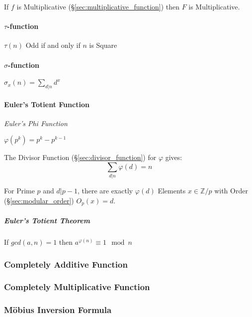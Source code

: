 If $f$ is Multiplicative (\S\ref{sec:multiplicative_function}) then
$F$ is Multiplicative.



\paragraph{$\tau$-function}\label{sec:tau_function}\hfill

$\tau(n)$ Odd if and only if $n$ is Square



\paragraph{$\sigma$-function}\label{sec:sigma_function}\hfill

$\sigma_x(n) = \sum_{d | n} d^x$



\paragraph{Euler's Totient Function}\label{sec:eulers_totient}\hfill

\emph{Euler's Phi Function}

$\varphi(p^k) = p^k - p^{k-1}$

The Divisor Function (\S\ref{sec:divisor_function}) for $\varphi$
gives:
\[
  \sum_{d|n}\varphi(d) = n
\]

For Prime $p$ and $d|p-1$, there are exactly $\varphi(d)$ Elements $x
\in \mathbb{Z}/p$ with Order (\S\ref{sec:modular_order}) $O_p(x) = d$.

\subparagraph{Euler's Totient Theorem}\label{sec:totient_theorem}\hfill

If $gcd(a,n) = 1$ then $a^{\varphi(n)} \equiv 1 \mod n$



\subsubsection{Completely Additive Function}
\label{sec:completely_additive_function}

\subsubsection{Completely Multiplicative Function}
\label{sec:completely_multiplicative_function}

\subsubsection{M\"obius Inversion Formula}
\label{sec:mobius_inversion}


